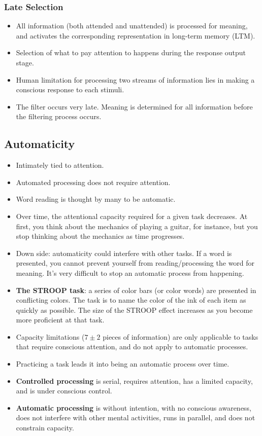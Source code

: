 \documentclass[]{article}
\begin{document}
			\subsubsection{Late Selection}
				\begin{itemize}
					\item All information (both attended and unattended) is processed for meaning, and activates the corresponding representation in long-term memory (LTM).
					\item Selection of what to pay attention to happens during the response output stage.
					\item Human limitation for processing two streams of information lies in making a conscious response to each stimuli.
					\item The filter occurs very late. Meaning is determined for all information before the filtering process occurs.
				\end{itemize}

		\subsection{Automaticity}
			\begin{itemize}
				\item Intimately tied to attention.
				\item Automated processing does not require attention.
				\item Word reading is thought by many to be automatic.
				\item Over time, the attentional capacity required for a given task decreases. At first, you think about the mechanics of playing a guitar, for instance, but you stop thinking about the mechanics as time progresses.
				\item Down side: automaticity could interfere with other tasks. If a word is presented, you cannot prevent yourself from reading/processing the word for meaning. It's very difficult to stop an automatic process from happening.
				\item \textbf{The STROOP task}: a series of color bars (or color words) are presented in conflicting colors. The task is to name the color of the ink of each item as quickly as possible. The size of the STROOP effect increases as you become more proficient at that task.
				\item Capacity limitations ($7 \pm 2$ pieces of information) are only applicable to tasks that require conscious attention, and do not apply to automatic processes.
				\item Practicing a task leads it into being an automatic process over time.
				\item \textbf{Controlled processing} is serial, requires attention, has a limited capacity, and is under conscious control.
				\item \textbf{Automatic processing} is without intention, with no conscious awareness, does not interfere with other mental activities, runs in parallel, and does not constrain capacity.
			\end{itemize}
\end{document}
